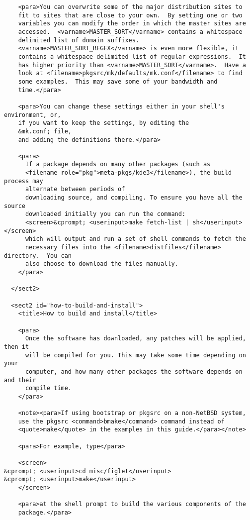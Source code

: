 \begin{verbatim}
    <para>You can overwrite some of the major distribution sites to
    fit to sites that are close to your own.  By setting one or two
    variables you can modify the order in which the master sites are
    accessed.  <varname>MASTER_SORT</varname> contains a whitespace
    delimited list of domain suffixes.
    <varname>MASTER_SORT_REGEX</varname> is even more flexible, it
    contains a whitespace delimited list of regular expressions.  It
    has higher priority than <varname>MASTER_SORT</varname>.  Have a
    look at <filename>pkgsrc/mk/defaults/mk.conf</filename> to find
    some examples.  This may save some of your bandwidth and
    time.</para>

    <para>You can change these settings either in your shell's environment, or,
    if you want to keep the settings, by editing the
    &mk.conf; file,
    and adding the definitions there.</para>

    <para>
      If a package depends on many other packages (such as
      <filename role="pkg">meta-pkgs/kde3</filename>), the build process may
      alternate between periods of
      downloading source, and compiling. To ensure you have all the source
      downloaded initially you can run the command:
      <screen>&cprompt; <userinput>make fetch-list | sh</userinput></screen>
      which will output and run a set of shell commands to fetch the
      necessary files into the <filename>distfiles</filename> directory.  You can
      also choose to download the files manually.
    </para>

  </sect2>

  <sect2 id="how-to-build-and-install">
    <title>How to build and install</title>

    <para>
      Once the software has downloaded, any patches will be applied, then it
      will be compiled for you. This may take some time depending on your
      computer, and how many other packages the software depends on and their
      compile time.
    </para>

    <note><para>If using bootstrap or pkgsrc on a non-NetBSD system,
    use the pkgsrc <command>bmake</command> command instead of
    <quote>make</quote> in the examples in this guide.</para></note>

    <para>For example, type</para>

    <screen>
&cprompt; <userinput>cd misc/figlet</userinput>
&cprompt; <userinput>make</userinput>
    </screen>

    <para>at the shell prompt to build the various components of the
    package.</para>


\end{verbatim}
